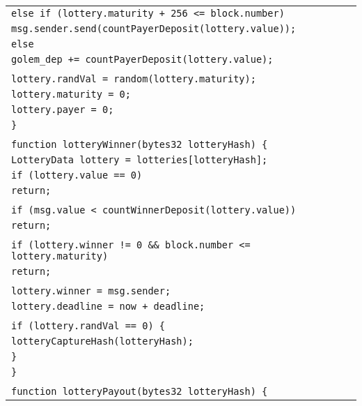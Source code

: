 \documentclass[a4paper]{article}
\begin{document}
\begin{tabularx}{\linewidth}{l}
        \qquad\qquad\texttt{else if (lottery.maturity + 256 <= block.number)}\\
        \qquad\qquad\qquad\texttt{msg.sender.send(countPayerDeposit(lottery.value));}\\
        \qquad\qquad\texttt{else}\\
        \qquad\qquad\qquad\texttt{golem\_dep += countPayerDeposit(lottery.value);}\\
        \\
        \qquad\qquad\texttt{lottery.randVal = random(lottery.maturity);}\\
        \qquad\qquad\texttt{lottery.maturity = 0;}\\
        \qquad\qquad\texttt{lottery.payer = 0;}\\
        \qquad\texttt{\}}\\
        \\
        \qquad\texttt{function lotteryWinner(bytes32 lotteryHash) \{}\\
        \qquad\qquad\texttt{LotteryData lottery = lotteries[lotteryHash];}\\
        \qquad\qquad\texttt{if (lottery.value == 0)}\\
        \qquad\qquad\qquad\texttt{return;}\\
        \\
        \qquad\qquad\texttt{if (msg.value < countWinnerDeposit(lottery.value))}\\
        \qquad\qquad\qquad\texttt{return;}\\
        \\
        \qquad\qquad\texttt{if (lottery.winner != 0 \&\& block.number <= lottery.maturity)}\\
        \qquad\qquad\qquad\texttt{return;}\\
        \\
        \qquad\qquad\texttt{lottery.winner = msg.sender;}\\
        \qquad\qquad\texttt{lottery.deadline = now + deadline;}\\
        \\
        \qquad\qquad\texttt{if (lottery.randVal == 0) \{}\\
        \qquad\qquad\qquad\texttt{lotteryCaptureHash(lotteryHash);}\\
        \qquad\qquad\texttt{\}}\\
        \qquad\texttt{\}}\\
        \\
        \qquad\texttt{function lotteryPayout(bytes32 lotteryHash) \{}\\

\end{tabularx}
\end{document}
